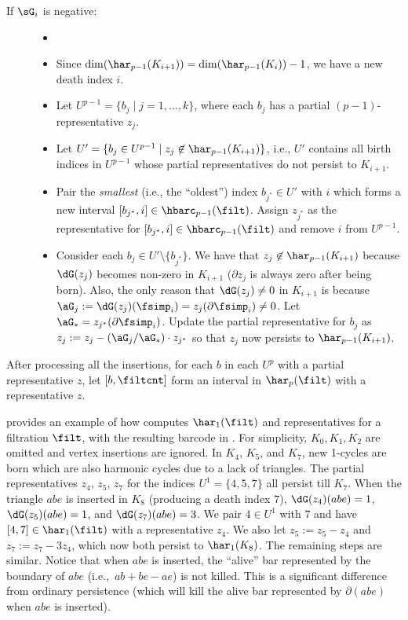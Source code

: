 \begin{algrl}
\begin{description}
    \item[If $\sG_i$ is negative:] 
        \begin{itemize}
        \item[]
        \item Since $\dim(\har_{p-1}(K_{i+1}))=\dim(\har_{p-1}(K_{i}))-1$, we have a new death index $i$.
        \item Let $U^{p-1}=\{b_j\mid j=1,\ldots,k\}$, where each $b_j$ has a partial $(p-1)$-representative $z_j$.
        \item Let $U'=\{b_j\in U^{p-1}\mid z_j\not\in\har_{p-1}(K_{i+1})\}$, i.e., $U'$ contains all  birth indices in $U^{p-1}$ whose partial representatives do not persist to $K_{i+1}$.
        \item Pair the \emph{smallest} (i.e., the ``oldest'') index $b_{j^*}\in U'$ with $i$ which forms a new interval $[b_{j^*},i]\in\hbarc_{p-1}(\filt)$. Assign $z_{j^*}$ as the representative for $[b_{j^*},i]\in\hbarc_{p-1}(\filt)$ and remove $i$ from $U^{p-1}$.
        \item Consider each $b_{j}\in U'\setminus\{b_{j^*}\}$. We have that $z_j\not\in\har_{p-1}(K_{i+1})$ because $\dG(z_j)$ becomes non-zero in $K_{i+1}$ ($\partial z_j$ is always zero after being born). Also, the only reason that  $\dG(z_j)\neq 0$ in $K_{i+1}$ is because  $\aG_j:=\dG(z_j)(\fsimp_i)=z_j(\partial\fsimp_i)\neq 0$. Let $\aG_*=z_{j^*}(\partial\fsimp_i)$. Update the partial representative for $b_j$ as $z_j:= z_j-(\aG_j/\aG_*)\cdot z_{j^*}$ so that $z_j$ now persists to $\har_{p-1}(K_{i+1})$.
\end{itemize}
\end{description}

After processing all the insertions, for each $b$ in each $U^p$ with a partial representative $z$, let $[b,\filtcnt]$ form an interval in $\har_p(\filt)$ with a representative $z$.
\end{algrl}

\begin{example*}
 provides an example of how  computes {\hcb} $\har_1(\filt)$ and representatives for a filtration $\filt$, with the resulting barcode  in . For simplicity, $K_0, K_1, K_2$ are omitted and vertex insertions are ignored. 
In $K_4$, $K_5$, and $K_7$, new 1-cycles are born which are also harmonic cycles due to a lack of triangles. The partial representatives $z_4$, $z_5$, $z_7$ for the indices $U^1=\{4,5,7\}$ all persist till $K_7$. 
When the triangle $abe$ is inserted in $K_8$ (producing a death index $7$), $\dG(z_4)(abe)=1$, $\dG(z_5)(abe)=1$, and $\dG(z_7)(abe)=3$.
We pair $4\in U^1$ with $7$ and have $[4,7]\in\har_1(\filt)$ with a representative $z_4$.
We also let $z_5:=z_5-z_4$ and $z_7:=z_7-3z_4$, which now both persist to $\har_1(K_8)$.
The remaining steps are similar. Notice that when $abe$ is inserted, the ``alive'' bar represented by the boundary of $abe$ (i.e.,~$ab+be-ae$) is not killed.
This is a significant difference from ordinary persistence (which will kill the alive bar represented by $\partial(abe)$ when $abe$ is inserted).
\end{example*}


